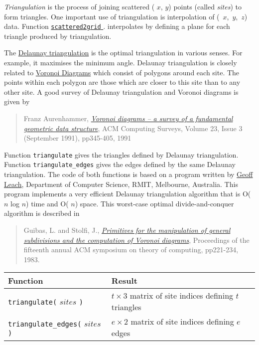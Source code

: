   \par 
  \textit{Triangulation} is the process of joining scattered ( 
  $x$, 
  $y$) points (called 
  \textit{sites}) to form triangles. One important use of triangulation
  is interpolation of 
  \mbox{( 
  $x$, 
  $y$, 
  $z$)} data. Function 
  \href{nap-function-lib.html\#scattered2grid}{ \texttt{scattered2grid} } . interpolates by defining a plane for each triangle produced by
  triangulation.
  \par The 
  \href{http://www.ics.uci.edu/$\sim$eppstein/gina/delaunay.html}{Delaunay triangulation} is the optimal triangulation in various senses. For
  example, it maximises the minimum angle. Delaunay triangulation is
  closely related to 
  \href{http://www.ics.uci.edu/$\sim$eppstein/gina/voronoi.html}{Voronoi Diagrams} which consist of polygons around each site. The points
  within each polygon are those which are closer to this site than to
  any other site. A good survey of Delaunay triangulation and Voronoi
  diagrams is given by
  \begin{quote}Franz Aurenhammer, 
  \href{http://portal.acm.org/citation.cfm?doid=116873.116880}{\emph{Voronoi diagrams -- a survey of a fundamental geometric data structure}}, ACM Computing Surveys, Volume 23, Issue 3 (September 1991),
  pp345-405, 1991\end{quote}
  \par Function 
  \texttt{triangulate} gives the triangles defined by Delaunay
  triangulation. Function 
  \texttt{triangulate\_edges} gives the edges defined by the same
  Delaunay triangulation. The code of both functions is based on a
  program written by 
  \href{http://goanna.cs.rmit.edu.au/$\sim$gl/}{Geoff Leach},
  Department of Computer Science, RMIT, Melbourne, Australia. This
  program implements a very efficient Delaunay triangulation algorithm
  that is O( 
  $n$ log 
  $n$) time and O( 
  $n$) space. This worst-case optimal divide-and-conquer
  algorithm is described in
  \begin{quote}Guibas, L. and Stolfi, J., 
  \href{http://portal.acm.org/citation.cfm?id=808751$\backslash$\&amp;dl=ACM$\backslash$\&amp;coll=portal}{ \emph{Primitives for the manipulation of general subdivisions and the computation of Voronoi diagrams}}, Proceedings of the fifteenth annual ACM symposium on theory of
  computing, pp221-234, 1983.\end{quote}
  \par

  \begin{tabular}{|l|l|}
    \hline 
      \textbf{Function} & \textbf{Result}
    \\
      \hline 
      \hline 
        \texttt{triangulate(} $sites$ \texttt{)} & $t\times 3$ matrix of site indices defining $t$ triangles
      \\
      \hline 
        \texttt{triangulate\_edges(} $sites$ \texttt{)} & $e\times 2$ matrix of site indices defining $e$ edges
      \\
  \hline
\end{tabular}

